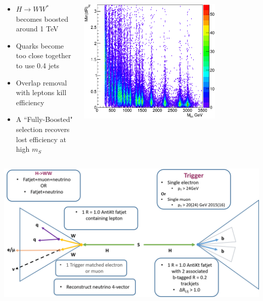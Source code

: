 \documentclass{beamer}
\newcommand*{\header}[1]{\fontsize{16}{8}\selectfont \textbf{{\color{MyPurple}{#1}}}}
\begin{document}
\begin{frame}
\begin{center}
\header{Motivation}
\end{center}
\vspace{-0.5cm}
\begin{columns}
\begin{column}{0.5\textwidth}
\begin{itemize}
\footnotesize
\item $H\rightarrow{}WW^*$ becomes boosted around 1 TeV 
\item Quarks become too close together to use 0.4 jets
\item Overlap removal with leptons kill efficiency
\item A ``Fully-Boosted" selection recovers lost efficiency at high $m_S$
\end{itemize}
\end{column}
\begin{column}{0.5\textwidth}
\begin{center}
\includegraphics[width=0.75\textwidth]{figures/drminlq}
\end{center}
\end{column}
\end{columns}
\end{frame}

\begin{frame}
\begin{center}
\header{Fully Boosted Event Selection}
\end{center}
\begin{center}
\includegraphics[width=1\textwidth]{figures/fullboost}
\end{center}
\end{frame}
\end{document}
